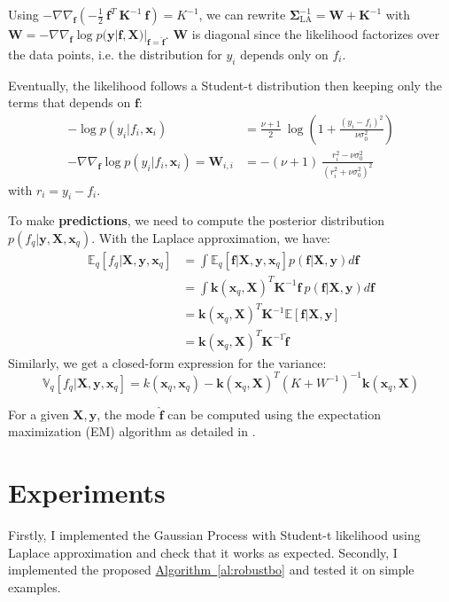 \documentclass{article}
\newcommand{\mbs}[1]{\ensuremath{\boldsymbol{#1}}}
\newcommand{\x}{\mathbf{x}}
\newcommand{\y}{\mathbf{y}}
\newcommand{\f}{\mathbf{f}}
\newcommand{\algoref}[1]{\hyperref[#1]{Algorithm~\ref{#1}}}
\newcommand{\K}{\mathbf{K}}
\newcommand{\X}{\mathbf{X}}
\newcommand{\Sigmab}{\mbs{\Sigma}}
\begin{document}
Using $- \nabla \nabla_\f \left( - \frac{1}{2} \ \f^T \ \K^{-1} \ \f \right) = K^{-1} $, we can rewrite $\Sigmab_{\text{LA}}^{-1} = \mathbf{W} + \K^{-1}$ with $\mathbf{W} = - \nabla \nabla_\f \log p(\y | \f, \X) |_{\f = \hat{\f}}$. $\mathbf{W}$ is diagonal since the likelihood factorizes over the data points, i.e. the distribution for $y_i$ depends only on $f_i$.

Eventually, the likelihood follows a Student-t distribution then keeping only the terms that depends on $\f$:
\begin{align*}
  - \log p(y_i | f_i, \x_i) &= \frac{\nu + 1}{2} \ \log \left( 1 + \frac{(y_i - f_i)^2}{\nu \sigma_0^2}\right) \\
  - \nabla \nabla_\f \log p(y_i | f_i, \x_i) = \mathbf{W}_{i, i} &= - (\nu + 1) \ \frac{r_i^2 - \nu \sigma_0^2}{(r_i^2 + \nu \sigma_0^2)^2}
\end{align*}
with $r_i = y_i - f_i$.

To make \textbf{predictions}, we need to compute the posterior distribution $p(f_q | \y, \X, \x_q)$. With the Laplace approximation, we have:
\begin{align}
  \mathbb{E}_q [f_q | \X, \y, \x_q] &= \int \mathbb{E}_q [\f | \X, \y, \x_q] p(\f | \X, \y) d\f \nonumber \\
  &= \int \mathbf{k}(\x_q, \X)^T \K^{-1} \f \ p(\f | \X, \y) d\f \nonumber \\
  &= \mathbf{k}(\x_q, \X)^T \K^{-1} \mathbb{E} [\f | \X, \y] \nonumber \\
  &=  \mathbf{k}(\x_q, \X)^T \K^{-1} \hat{\f}
\end{align}
Similarly, we get a closed-form expression for the variance:
\begin{equation}
  \mathbb{V}_q [f_q | \X, \y, \x_q] = k(\x_q, \x_q) - \mathbf{k}(\x_q, \X)^T \left(K + W^{-1}\right)^{-1} \mathbf{k}(\x_q, \X)
\end{equation}

For a given $\X, \y$, the mode $\hat{\f}$ can be computed using the expectation maximization (EM) algorithm as detailed in \cite{NIPS2009_13fe9d84}.

\section{Experiments}

Firstly, I implemented the Gaussian Process with Student-t likelihood using Laplace approximation and check that it works as expected. Secondly, I implemented the proposed \algoref{al:robustbo} and tested it on simple examples.
\end{document}
